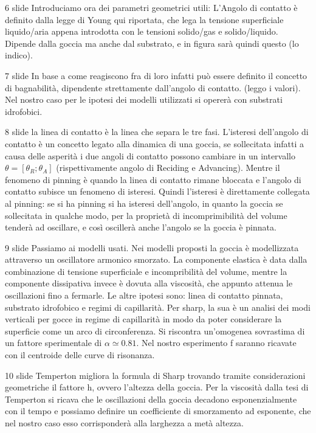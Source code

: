 6 slide
Introduciamo ora dei parametri geometrici utili:
L'Angolo di contatto è definito dalla legge di Young qui riportata, che lega la tensione superficiale liquido/aria appena introdotta con le tensioni solido/gas e solido/liquido. Dipende dalla goccia ma anche dal substrato, e in figura sarà quindi questo (lo indico).

7 slide
In base a come reagiscono fra di loro infatti può essere definito il concetto di bagnabilità, dipendente strettamente dall'angolo di contatto.
(leggo i valori). Nel nostro caso per le ipotesi dei modelli utilizzati si opererà con substrati idrofobici.

8 slide
la linea di contatto è la linea che separa le tre fasi. 
L'isteresi dell'angolo di contatto è un concetto legato alla dinamica di una goccia, se sollecitata infatti a causa delle asperità i due angoli di contatto possono cambiare in un intervallo $\theta=[\theta_R;\theta_A]$ (rispettivamente angolo di Reciding e Advancing). 
Mentre il fenomeno di pinning è quando la linea di contatto rimane bloccata e l'angolo di contatto subisce un fenomeno di isteresi. Quindi l'isteresi è direttamente collegata al pinning: se si ha pinning si ha isteresi dell'angolo, in quanto la goccia se sollecitata in qualche modo, per la proprietà di incomprimibilità del volume tenderà ad oscillare, e così oscillerà anche l'angolo se la goccia è pinnata.

9 slide
Passiamo ai modelli usati. Nei modelli proposti la goccia è modellizzata attraverso un oscillatore armonico smorzato. La componente elastica è data dalla combinazione di tensione superficiale e incompribilità del volume, mentre la componente dissipativa invece è dovuta alla viscosità, che appunto attenua le oscillazioni fino a fermarle.
Le altre ipotesi sono: linea di contatto pinnata, substrato idrofobico e regimi di capillarità.
Per sharp, la sua è un analisi dei modi verticali per gocce in regime di capillarità in modo da poter considerare la superficie come un arco di circonferenza. Si riscontra un'omogenea sovrastima di un fattore sperimentale di $\alpha\simeq0.81$. Nel nostro esperimento f saranno ricavate con il centroide delle curve di risonanza.


10 slide 
Temperton migliora la formula di Sharp trovando tramite considerazioni geometriche il fattore h, ovvero l'altezza della goccia.
Per la viscosità dalla tesi di Temperton si ricava che le oscillazioni della goccia decadono esponenzialmente con il tempo e possiamo definire un coefficiente di smorzamento ad esponente, che nel nostro caso esso corrisponderà alla larghezza a metà altezza.

